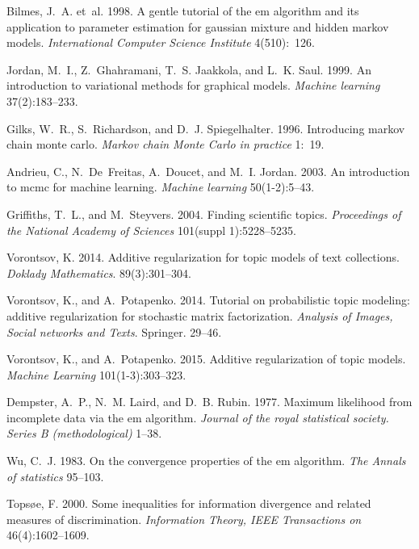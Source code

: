 \documentclass[12pt, twoside]{article}
\begin{document}
\begin{thebibliography}{10}
Bilmes, J.~A. et~al.
1998.
A gentle tutorial of the em algorithm and its application to parameter
  estimation for gaussian mixture and hidden markov models.
\emph{International Computer Science Institute}
4(510):~126.

Jordan, M.~I., Z.~Ghahramani, T.~S. Jaakkola,  and L.~K. Saul.
1999.
An introduction to variational methods for graphical models.
\emph{Machine learning}
37(2):183--233.

Gilks, W.~R., S.~Richardson,  and D.~J. Spiegelhalter.
1996.
Introducing markov chain monte carlo.
\emph{Markov chain Monte Carlo in practice}
1:~19.

Andrieu, C., N.~De~Freitas, A.~Doucet,  and M.~I. Jordan.
2003.
An introduction to mcmc for machine learning.
\emph{Machine learning}
50(1-2):5--43.

Griffiths, T.~L.,  and M.~Steyvers.
2004.
Finding scientific topics.
\emph{Proceedings of the National Academy of Sciences}
101(suppl 1):5228--5235.

Vorontsov, K.
2014.
Additive regularization for topic models of text collections.
\emph{Doklady Mathematics}.
89(3):301--304.

Vorontsov, K.,  and A.~Potapenko.
2014.
Tutorial on probabilistic topic modeling: additive regularization for
  stochastic matrix factorization.
\emph{Analysis of Images, Social networks and Texts}.
Springer.
29--46.

Vorontsov, K.,  and A.~Potapenko.
2015.
Additive regularization of topic models.
\emph{Machine Learning}
101(1-3):303--323.

Dempster, A.~P., N.~M. Laird,  and D.~B. Rubin.
1977.
Maximum likelihood from incomplete data via the em algorithm.
\emph{Journal of the royal statistical society. Series B (methodological)}
1--38.

Wu, C.~J.
1983.
On the convergence properties of the em algorithm.
\emph{The Annals of statistics}
95--103.

Tops{\o}e, F.
2000.
Some inequalities for information divergence and related measures of
  discrimination.
\emph{Information Theory, IEEE Transactions on}
46(4):1602--1609.

\end{thebibliography}
\end{document}

